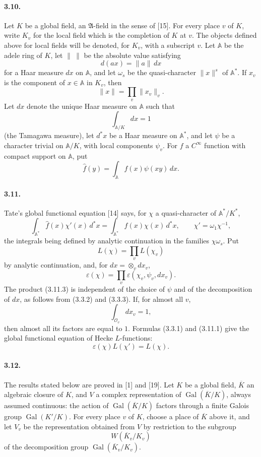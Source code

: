 \documentclass[10pt]{article}
\newcommand{\Gal}{\operatorname{Gal}}
\providecommand{\Gal}{\operatorname{Gal}}
\providecommand{\Gal}{\operatorname{Gal}}
\providecommand{\Gal}{\operatorname{Gal}}
\providecommand{\Gal}{\operatorname{Gal}}
\begin{document}
\paragraph{3.10.} Let \(K\) be a global field, an \(\mathfrak A\)-field in the sense of [15]. For every place \(v\) of \(K\), write \(K_v\) for the local field which is the completion of \(K\) at \(v\). The objects defined above for local fields will be denoted, for \(K_v\), with a subscript \(v\). Let \(\mathbb A\) be the adele ring of \(K\), let \(\|\ \|\) be the absolute value satisfying
\[
d(ax)=\|a\|\,dx
\]
for a Haar measure \(dx\) on \(\mathbb A\), and let \(\omega_s\) be the quasi-character \(\|x\|^s\) of \(\mathbb A^*\). If \(x_v\) is the component of \(x\in\mathbb A\) in \(K_v\), then
\[
\|x\|=\prod_v\|x_v\|_v.
\]
Let \(dx\) denote the unique Haar measure on \(\mathbb A\) such that
\[
\int_{\mathbb A/K}dx=1
\]
(the Tamagawa measure), let \(d^*x\) be a Haar measure on \(\mathbb A^*\), and let \(\psi\) be a character trivial on \(\mathbb A/K\), with local components \(\psi_v\). For \(f\) a \(C^\infty\) function with compact support on \(\mathbb A\), put
\[
\widehat f(y)=\int_{\mathbb A}f(x)\psi(xy)\,dx.
\]


\newpage

\paragraph{3.11.} Tate's global functional equation [14] says, for \(\chi\) a quasi-character of \(\mathbb A^*/K^*\),
\[
\tag{3.11.1}
\int_{\mathbb A^*}\widehat f(x)\chi'(x)\,d^*x
=
\int_{\mathbb A^*}f(x)\chi(x)\,d^*x,
\qquad
\chi'=\omega_1\chi^{-1},
\]
the integrals being defined by analytic continuation in the families \(\chi\omega_s\). Put
\[
\tag{3.11.2}
L(\chi)=\prod_vL(\chi_v)
\]
by analytic continuation, and, for \(dx=\otimes_vdx_v\),
\[
\tag{3.11.3}
\varepsilon(\chi)=\prod_v\varepsilon(\chi_v,\psi_v,dx_v).
\]
The product (3.11.3) is independent of the choice of \(\psi\) and of the decomposition of \(dx\), as follows from (3.3.2) and (3.3.3). If, for almost all \(v\),
\[
\int_{\mathcal O_v}dx_v=1,
\]
then almost all its factors are equal to \(1\). Formulas (3.3.1) and (3.11.1) give the global functional equation of Hecke \(L\)-functions:
\[
\tag{3.11.4}
\varepsilon(\chi)L(\chi')=L(\chi).
\]


\newpage

\paragraph{3.12.} The results stated below are proved in [1] and [19]. Let \(K\) be a global field, \(\overline K\) an algebraic closure of \(K\), and \(V\) a complex representation of \(\Gal(\overline K/K)\), always assumed continuous: the action of \(\Gal(\overline K/K)\) factors through a finite Galois group \(\Gal(K'/K)\). For every place \(v\) of \(K\), choose a place of \(\overline K\) above it, and let \(V_v\) be the representation obtained from \(V\) by restriction to the subgroup
\[
W(\overline K_v/K_v)
\]
of the decomposition group \(\Gal(\overline K_v/K_v)\).
\end{document}
